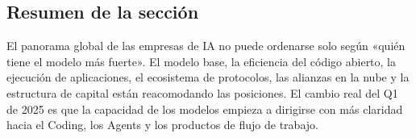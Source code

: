 \subsection{Resumen de la sección}

El panorama global de las empresas de IA no puede ordenarse solo según «quién tiene el modelo más fuerte». El modelo base, la eficiencia del código abierto, la ejecución de aplicaciones, el ecosistema de protocolos, las alianzas en la nube y la estructura de capital están reacomodando las posiciones. El cambio real del Q1 de 2025 es que la capacidad de los modelos empieza a dirigirse con más claridad hacia el Coding, los Agents y los productos de flujo de trabajo.
